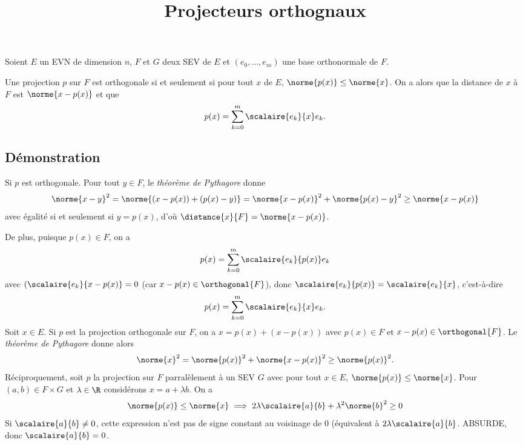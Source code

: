 \documentclass[fontsize=12pt,twoside=false,parskip=half, french]{scrartcl}
\title{Projecteurs orthognaux}
\date{}
\author{}
\begin{document}
\maketitle
   Soient $E$ un EVN de dimension $n$, $F$ et $G$ deux SEV de $E$ et $(e_0, \ldots,e_m)$ une base 
   orthonormale de $F$.
   \begin{Theoreme}
      Une projection $p$ sur $F$ est orthogonale si et seulement si pour tout $x$ de $E$, $\norme{p(x)} \leq \norme{x}$.
      On a alors que la distance de $x$ à $F$ est $\norme{x - p(x)}$ et que
      \[
         p(x) = \sum_{k = 0}^{m} \scalaire{e_k}{x} e_k.
      \]
   \end{Theoreme}
   \subsection{Démonstration}
      Si $p$ est orthogonale. Pour tout $y \in F$, le \emph{théorème de Pythagore} donne %
      \[
         \norme{x - y}^2 = \norme{(x - p(x)) + (p(x) - y)} 
                         = \norme{x - p(x)}^2 + \norme{p(x) - y}^2
                         \geq \norme{x - p(x)}         
      \]
      avec égalité si et seulement si $y = p(x)$, d’où $\distance{x}{F} = \norme{x - p(x)}$. 
      
      De plus, puisque $p(x) \in F$, on a
      \[
         p(x) = \sum_{k = 0}^m \scalaire{e_k}{p(x)} e_k 
      \]
      avec $(\scalaire{e_k}{x - p(x)} = 0 $ (car $x - p(x) \in \orthogonal{F}$), donc 
      $\scalaire{e_k}{p(x)} = \scalaire{e_k}{x}$, c’est-à-dire
      \[
         p(x) = \sum_{k = 0}^{m} \scalaire{e_k}{x} e_k.
      \]
      Soit $x \in E$. Si $p$ est la projection orthogonale sur $F$, on a $x = p(x) + (x - p(x))$
      avec $p(x) \in F$ et $x - p(x) \in \orthogonal{F}$. Le \emph{théorème de Pythagore} donne alors
      \[
         \norme{x}^2 = \norme{p(x)}^2 + \norme{x - p(x)}^2 \geq \norme{p(x)}^2.
      \]
      Réciproquement, soit $p$ la projection sur $F$ parralèlement à un SEV $G$ avec
      pour tout $x \in E$, $\norme{p(x)} \leq \norme{x}$. Pour $(a, b) \in F \times G$
      et $\lambda \in \R$ considérons $x = a + \lambda b$. On a 
      \[
         \norme{p(x)} \leq \norme{x} \implies 2\lambda \scalaire{a}{b} + \lambda^2\norme{b}^2 \geq 0
      \]
      Si $\scalaire{a}{b} \neq 0$, cette expression n’est pas de signe constant au voisinage de $0$
      (équivalent à $2 \lambda\scalaire{a}{b}$. ABSURDE, donc $\scalaire{a}{b} = 0$.
\end{document}
